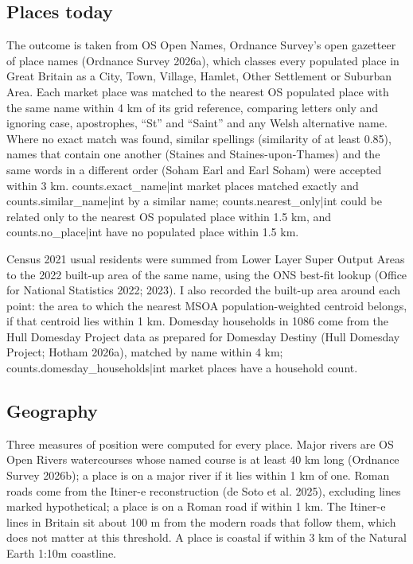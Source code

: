 \documentclass[11pt,a4paper]{article}
\begin{document}
\subsection{Places today}

The outcome is taken from OS Open Names, Ordnance Survey's open gazetteer of place names (Ordnance Survey 2026a), which classes every populated place in Great Britain as a City, Town, Village, Hamlet, Other Settlement or Suburban Area. Each market place was matched to the nearest OS populated place with the same name within 4 km of its grid reference, comparing letters only and ignoring case, apostrophes, ``St'' and ``Saint'' and any Welsh alternative name. Where no exact match was found, similar spellings (similarity of at least 0.85), names that contain one another (Staines and Staines-upon-Thames) and the same words in a different order (Soham Earl and Earl Soham) were accepted within 3 km. {{counts.exact_name|int}} market places matched exactly and {{counts.similar_name|int}} by a similar name; {{counts.nearest_only|int}} could be related only to the nearest OS populated place within 1.5 km, and {{counts.no_place|int}} have no populated place within 1.5 km.

Census 2021 usual residents were summed from Lower Layer Super Output Areas to the 2022 built-up area of the same name, using the ONS best-fit lookup (Office for National Statistics 2022; 2023). I also recorded the built-up area around each point: the area to which the nearest MSOA population-weighted centroid belongs, if that centroid lies within 1 km. Domesday households in 1086 come from the Hull Domesday Project data as prepared for Domesday Destiny (Hull Domesday Project; Hotham 2026a), matched by name within 4 km; {{counts.domesday_households|int}} market places have a household count.

\subsection{Geography}

Three measures of position were computed for every place. Major rivers are OS Open Rivers watercourses whose named course is at least 40 km long (Ordnance Survey 2026b); a place is on a major river if it lies within 1 km of one. Roman roads come from the Itiner-e reconstruction (de Soto et al. 2025), excluding lines marked hypothetical; a place is on a Roman road if within 1 km. The Itiner-e lines in Britain sit about 100 m from the modern roads that follow them, which does not matter at this threshold. A place is coastal if within 3 km of the Natural Earth 1:10m coastline.
\end{document}
